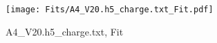 \begin{figure}[ht] 
 	\centering 
 	\texttt{[image: Fits/A4\_V20.h5\_charge.txt\_Fit.pdf]} 
	\caption{A4_V20.h5_charge.txt, Fit} 
 	\label{fig:A4_V20.h5_charge.txt, Fit} 
\end{figure}
 \\ 
